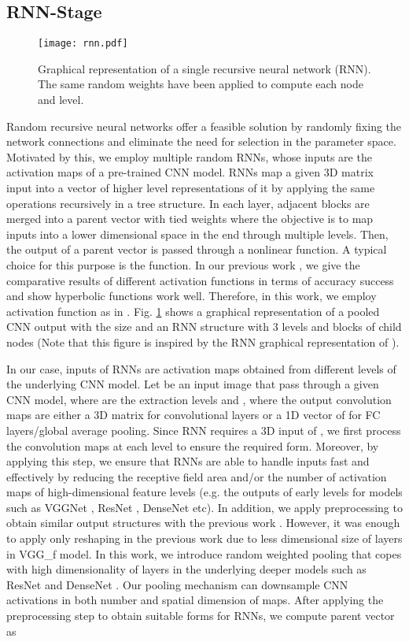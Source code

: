 \documentclass[10pt,journal,compsoc]{IEEEtran}
\begin{document}
\subsection{RNN-Stage}
\begin{figure}[!t]
	\centering
	\texttt{[image: rnn.pdf]}
	\caption{Graphical representation of a single recursive neural network (RNN). The same random weights have been applied to compute each node and level.}
	\label{fig:RNN}
\end{figure}
Random recursive neural networks offer a feasible solution by randomly fixing the network connections and eliminate the need for selection in the parameter space. Motivated by this, we employ multiple random RNNs, whose inputs are the activation maps of a pre-trained CNN model. RNNs map a given 3D matrix input into a vector of higher level representations of it by applying the same operations recursively in a tree structure. In each layer, adjacent blocks are merged into a parent vector with tied weights where the objective is to map inputs   into a lower dimensional space   in the end through multiple levels. Then, the output of a parent vector is passed through a nonlinear function. A typical choice for this purpose is the  function. In our previous work \cite{Caglayan_ECCVW_2018}, we give the comparative results of different activation functions in terms of accuracy success and show hyperbolic functions work well. Therefore, in this work, we employ  activation function as in \cite{Socher_NIPS_2012, Caglayan_ECCVW_2018}. Fig. \ref{fig:RNN} shows a graphical representation of a pooled CNN output with the size  and an RNN structure with 3 levels and blocks of  child nodes (Note that this figure is inspired by the RNN graphical representation of \cite{Socher_NIPS_2012}).

In our case, inputs of RNNs are activation maps obtained from different levels of the underlying CNN model. Let  be an input image that pass through  a given CNN model, where  are the extraction levels and , where the output convolution maps are either a 3D matrix  for  convolutional layers or a 1D vector of  for  FC layers/global average pooling. Since RNN requires a 3D input of , we first process the convolution maps at each level to ensure the required form. Moreover, by applying this step, we ensure that RNNs are able to handle inputs fast and effectively by reducing the receptive field area and/or the number of activation maps of high-dimensional feature levels (e.g. the outputs of early levels for models such as VGGNet \cite{Simonyan_ICLR_2015}, ResNet \cite{He_CVPR_2016}, DenseNet \cite{Huang_CVPR_2017} etc). In addition, we apply preprocessing to obtain similar output structures with the previous work \cite{Caglayan_ECCVW_2018}. However, it was enough to apply only reshaping in the previous work due to less dimensional size of layers in VGG\_f model. In this work, we introduce random weighted pooling that copes with high dimensionality of layers in the underlying deeper models such as ResNet \cite{He_CVPR_2016} and DenseNet \cite{Huang_CVPR_2017}. Our pooling mechanism can downsample CNN activations in both number and spatial dimension of maps. After applying the preprocessing step to obtain suitable forms for RNNs, we compute parent vector as
\end{document}
